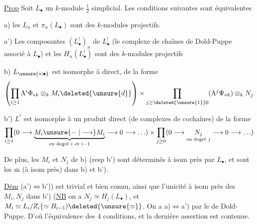 \uline{Prop} Soit $L_{\bullet}$ un $k$-module $\frac12$ simplicial. Les conditions suivantes sont équivalentes

a) les $L_n$ et $\pi_n(L_{\bullet})$ sont des $k$-modules projectifs.

a'{)} Les composantes  $(L_{\bullet}^!)_n$ de $L_{\bullet}^!$ (le complexe de chaînes de Dold-Puppe associé à $L_{\bullet}$) et les $H_n(L_{\bullet}^!)$ sont des $k$-modules projectifs

b) $L_{\unsure{*|\bullet}}$ est isomorphe à    direct,  de la forme
\[
\left(\prod_{i\geq1}\Lambda^i\Phi_{*k}\otimes_k M_i\deleted{\unsure{d}}\right)
 \times\prod_{j\geq\deleted{\unsure{1}}0}(\Lambda^j\Psi_{*k})\otimes_k N_j
\]

 b') $L^!$ est isomorphe à un produit direct (de complexes de cochaînes) de la forme
\[
\prod_{i\geq1}(0\longrightarrow\underbrace{M_i
 \unsure{\mathrel{-}|\longrightarrow}M_i}_{\text{en degré }i\ \text{et }i-1}
 \longrightarrow0\longrightarrow\ldots)
 \times\prod_{j\geq0}(0\longrightarrow
 \underset{\text{en degré }j}{N_j}\longrightarrow0\longrightarrow\ldots)
\]

De plus, les $M_i$ et $N_j$ de b) (resp b') sont déterminés à isom près par  $L_{\bullet}$, et  sont les $\overline{\mathrm{m}}$ (à isom près) dans b) et b').

\uline{Dém} (a'{)}$\Longleftrightarrow$b')) est trivial et bien connu, ainsi que l'unicité à isom  près des $M_i,N_j$ dans b') (\uline{NB} on a $N_j\simeq H_j(L_{\bullet})$, et $M_i\simeq L_i/Z_i\{\simeq B_{i-1})\deleted{\unsure{\simeq}}$. On a a)$\Longleftrightarrow$a')  par le  de Dold-Puppe. D'où l'équivalence des 4 conditions, et la dernière assertion est contenue.
